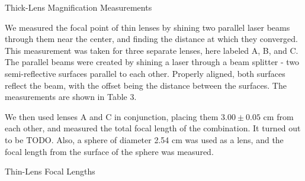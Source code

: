 \documentclass[journal]{IEEEtran}
\begin{document}
\begin{table}[ht]
    \centering
    \caption*{\normalsize{Thick-Lens Magnification Measurements}}
    \medskip
    \caption*{Table 2: Image sizes of concave and plano-convex lenses, first
    in that order, then in reverse order.}
\end{table}

We measured the focal point of thin lenses by shining two parallel laser beams
through them near the center, and finding the distance at which they converged.
This measurement was taken for three separate lenses, here labeled A, B, and C.
The parallel beams were created by shining a laser through a beam splitter -
two semi-reflective surfaces parallel to each other. Properly aligned, both
surfaces reflect the beam, with the offset being the distance between the
surfaces. The measurements are shown in Table 3.

We then used lenses A and C in conjunction, placing them $3.00 \pm 0.05$ cm
from each other, and measured the total focal length of the combination. It
turned out to be TODO. Also, a sphere of diameter 2.54 cm was used as a lens,
and the focal length from the surface of the sphere was measured.

\begin{table}[ht]
    \centering
    \caption*{\normalsize{Thin-Lens Focal Lengths}}
    \medskip
    \caption*{Table 3: Focal lengths of multiple thing lenses, measured by
    converging two parallel laser beams.}
\end{table}
\end{document}
